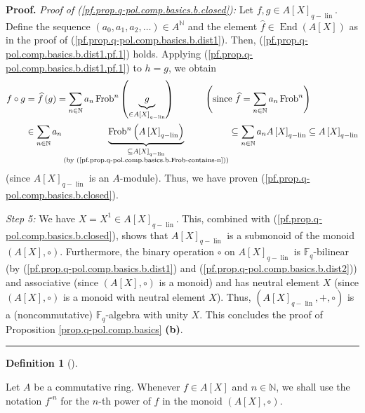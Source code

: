 \documentclass[numbers=enddot,12pt,final,onecolumn,notitlepage]{scrartcl}%
\theoremstyle{definition}
\newtheorem{defi}[theo]{Definition}
\newenvironment{definition}[1][]
{\begin{defi}[#1]\begin{leftbar}}
{\end{leftbar}\end{defi}}
\newenvironment{proof}[1][Proof]{\noindent\textbf{#1.} }{\ \rule{0.5em}{0.5em}}
\let\sumnonlimits\sum
\renewcommand{\sum}{\sumnonlimits\limits}
\begin{document}
\begin{proof}
\textit{Proof of (\ref{pf.prop.q-pol.comp.basics.b.closed}):} Let $f,g\in
A\left[  X\right]  _{q-\operatorname*{lin}}$. Define the sequence $\left(
a_{0},a_{1},a_{2},\ldots\right)  \in A^{\mathbb{N}}$ and the element
$\widehat{f}\in\operatorname*{End}\left(  A\left[  X\right]  \right)  $ as in
the proof of (\ref{pf.prop.q-pol.comp.basics.b.dist1}). Then,
(\ref{pf.prop.q-pol.comp.basics.b.dist1.pf.1}) holds. Applying
(\ref{pf.prop.q-pol.comp.basics.b.dist1.pf.1}) to $h=g$, we obtain%
\begin{align*}
f\circ g  &  =\widehat{f}\left(  g\right)  =\sum_{n\in\mathbb{N}}%
a_{n}\operatorname*{Frob}\nolimits^{n}\left(  \underbrace{g}_{\in A\left[
X\right]  _{q-\operatorname*{lin}}}\right)  \ \ \ \ \ \ \ \ \ \ \left(
\text{since }\widehat{f}=\sum_{n\in\mathbb{N}}a_{n}\operatorname*{Frob}%
\nolimits^{n}\right) \\
&  \in\sum_{n\in\mathbb{N}}a_{n}\underbrace{\operatorname*{Frob}%
\nolimits^{n}\left(  A\left[  X\right]  _{q-\operatorname*{lin}}\right)
}_{\substack{\subseteq A\left[  X\right]  _{q-\operatorname*{lin}}\\\text{(by
(\ref{pf.prop.q-pol.comp.basics.b.Frob-contains-n}))}}}\subseteq\sum
_{n\in\mathbb{N}}a_{n}A\left[  X\right]  _{q-\operatorname*{lin}}\subseteq
A\left[  X\right]  _{q-\operatorname*{lin}}%
\end{align*}
(since $A\left[  X\right]  _{q-\operatorname*{lin}}$ is an $A$-module). Thus,
we have proven (\ref{pf.prop.q-pol.comp.basics.b.closed}).

\textit{Step 5:} We have $X=X^{1}\in A\left[  X\right]
_{q-\operatorname*{lin}}$. This, combined with
(\ref{pf.prop.q-pol.comp.basics.b.closed}), shows that $A\left[  X\right]
_{q-\operatorname*{lin}}$ is a submonoid of the monoid $\left(  A\left[
X\right]  ,\circ\right)  $. Furthermore, the binary operation $\circ$ on
$A\left[  X\right]  _{q-\operatorname*{lin}}$ is $\mathbb{F}_{q}$-bilinear (by
(\ref{pf.prop.q-pol.comp.basics.b.dist1}) and
(\ref{pf.prop.q-pol.comp.basics.b.dist2})) and associative (since $\left(
A\left[  X\right]  ,\circ\right)  $ is a monoid) and has neutral element $X$
(since $\left(  A\left[  X\right]  ,\circ\right)  $ is a monoid with neutral
element $X$). Thus, $\left(  A\left[  X\right]  _{q-\operatorname*{lin}%
},+,\circ\right)  $ is a (noncommutative) $\mathbb{F}_{q}$-algebra with unity
$X$. This concludes the proof of Proposition \ref{prop.q-pol.comp.basics}
\textbf{(b)}.
\end{proof}

\begin{definition}
\label{def.q-pol.mon.not}Let $A$ be a commutative ring. Whenever $f\in
A\left[  X\right]  $ and $n\in\mathbb{N}$, we shall use the notation $f^{\circ
n}$ for the $n$-th power of $f$ in the monoid $\left(  A\left[  X\right]
,\circ\right)  $.
\end{definition}
\end{document}
